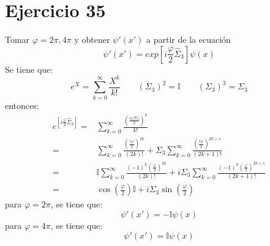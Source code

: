 \section*{Ejercicio 35}
Tomar $\varphi=2\pi,4\pi$ y obtener ${\psi}'({x}')$ a partir de la ecuación
\begin{equation*}
    {\psi}'({x}') = exp\left[i\frac{\varphi}{2}\hat{\Sigma}_3\right] \psi(x) 
\end{equation*}
Se tiene que:
\begin{equation*}
    e^{X}= \sum_{k=0}^\infty \frac{X^k}{k!}\qquad \left(\Sigma_3\right)^2 = \mathbb{I} \qquad \left(\Sigma_3\right)^3 = \Sigma_3
\end{equation*}
entonces:
\begin{align*}
    e^{\left[i\frac{\varphi}{2}\hat{\Sigma}_3\right]} =& \sum_{k=0}^\infty \frac{\left(\frac{i\varphi \Sigma_3 }{2}\right)^k}{k!}  \\
    =& \sum_{k=0}^\infty \frac{\left(\frac{i\varphi}{2}\right)^{2k}}{(2k)!} +\Sigma_3  \sum_{k=0}^\infty \frac{\left(\frac{i\varphi }{2}\right)^{2k+1}}{(2k+1)!}  \\ 
    =& \mathbb{I}\sum_{k=0}^\infty \frac{(-1)^k\left(\frac{\varphi}{2}\right)^{2k}}{(2k)!} +i\Sigma_3 \sum_{k=0}^\infty \frac{(-1)^k\left(\frac{\varphi }{2}\right)^{2k+1}}{(2k+1)!}  \\ 
    =& \cos\left(\frac{\varphi}{2}\right)\mathbb{I} + i\Sigma_3 \sin\left(\frac{\varphi}{2}\right)
\end{align*}
para $\varphi=2\pi$, se tiene que:
\begin{equation*}
    {\psi}'({x}') = -\mathbb{I} \psi(x)
\end{equation*}
para $\varphi=4\pi$, se tiene que:
\begin{equation*}
    {\psi}'({x}') = \mathbb{I}\psi(x)
\end{equation*}